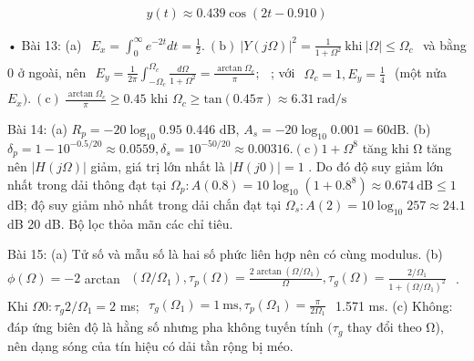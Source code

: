 \documentclass[
  10
]{article}
\begin{document}
\[
y (t) \approx 0. 4 3 9 \cos (2 t - 0. 9 1 0)
\]

• Bài 13: (a)
\(\begin{array} { r } { E _ { x } = \int _ { 0 } ^ { \infty } e ^ { - 2 t } d t = \frac { 1 } { 2 } . ~ ( \mathrm { b } ) ~ | Y ( j \Omega ) | ^ { 2 } = \frac { 1 } { 1 + \Omega ^ { 2 } } ~ \mathrm { k h i } ~ | \Omega | \leq \Omega _ { c } } \end{array}\)
và bằng 0 ở ngoài, nên
\(\begin{array} { r } { E _ { y } = \frac { 1 } { 2 \pi } \int _ { - \Omega _ { c } } ^ { \Omega _ { c } } \frac { d \Omega } { 1 + \Omega ^ { 2 } } = \frac { \arctan \Omega _ { c } } { \pi } ; } \end{array}\)
; với
\(\begin{array} { r } { \Omega _ { c } = 1 , E _ { y } = \frac { 1 } { 4 } } \end{array}\)
(một nửa
\(E _ { x } ) . ~ ( \mathrm { c } ) ~ \frac { \arctan \Omega _ { c } } { \pi } \ge 0 . 4 5\)
khi
\(\Omega _ { c } \geq \mathrm { t a n } ( 0 . 4 5 \pi ) \approx 6 . 3 1 ~ \mathrm { r a d / s }\)

Bài 14: (a) \(R _ { p } = - 2 0 \log _ { 1 0 } 0 . 9 5\) 0.446 dB,
\(A _ { s } = - 2 0 \log _ { 1 0 } 0 . 0 0 1 = 6 0 \mathrm { d B } .\)
(b)
\(\delta _ { p } = 1 - 1 0 ^ { - 0 . 5 / 2 0 } \approx 0 . 0 5 5 9 , \delta _ { s } = 1 0 ^ { - 5 0 / 2 0 } \approx 0 . 0 0 3 1 6 . \mathrm { ( c ) } 1 + \Omega ^ { 8 }\)
tăng khi Ω tăng nên \(| H ( j \Omega ) |\) giảm, giá trị lớn nhất là
\(| H ( j 0 ) | = 1\) . Do đó độ suy giảm lớn nhất trong dải thông đạt
tại
\(\Omega _ { p } \colon A ( 0 . 8 ) = 1 0 \log _ { 1 0 } ( 1 + 0 . 8 ^ { 8 } ) \approx 0 . 6 7 4 ~ \mathrm { d B } \le 1\)
dB; độ suy giảm nhỏ nhất trong dải chắn đạt tại
\(\Omega _ { s } \colon A ( 2 ) = 1 0 \log _ { 1 0 } 2 5 7 \approx 2 4 . 1\)
dB 20 dB. Bộ lọc thỏa mãn các chỉ tiêu.

Bài 15: (a) Tử số và mẫu số là hai số phức liên hợp nên có cùng modulus.
(b) \(\phi ( \Omega ) = - 2\) arctan
\(\begin{array} { r } { ( \Omega / \Omega _ { 1 } ) , \tau _ { p } ( \Omega ) = \frac { 2 \arctan ( \Omega / \Omega _ { 1 } ) } { \Omega } , \tau _ { g } ( \Omega ) = \frac { 2 / \Omega _ { 1 } } { 1 + ( \Omega / \Omega _ { 1 } ) ^ { 2 } } } \end{array}\)
. Khi \(\Omega  0 \colon \tau _ { g }  2 / \Omega _ { 1 } = 2\) ms;
\(\begin{array} { r } { \tau _ { g } ( \Omega _ { 1 } ) = 1 \ \mathrm { m s } , \tau _ { p } ( \Omega _ { 1 } ) = \frac { \pi } { 2 \Omega _ { 1 } } } \end{array}\)
1.571 ms. (c) Không: đáp ứng biên độ là hằng số nhưng pha không tuyến
tính \(( \tau _ { g }\) thay đổi theo Ω), nên dạng sóng của tín hiệu có
dải tần rộng bị méo.
\end{document}
